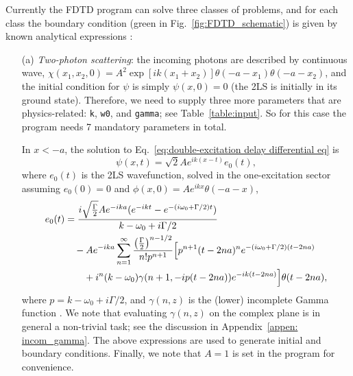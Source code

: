 \documentclass[12pt,letter,onecolumn,notitlepage]{article}
\begin{document}
Currently the FDTD program can solve three classes of problems, and for each class the boundary condition (green in Fig.~\ref{fig:FDTD_schematic}) is given by known analytical expressions \cite{FangNM17}:
\begin{enumerate}
	\item[(a)] \textit{Two-photon scattering}: the incoming photons are described by continuous wave, $\chi(x_1, x_2, 0) = A^2 \exp[i k (x_1+x_2)]\theta(-a-x_1)\theta(-a-x_2)$, and the initial condition for $\psi$ is simply $\psi(x,0)=0$ (the 2LS is initially in its ground state). Therefore, we need to supply three more parameters that are physics-related: \texttt{k}, \texttt{w0}, and \texttt{gamma}; see Table~\ref{table:input}. So for this case the program needs 7 mandatory parameters in total.
	
In $x<-a$, the solution to Eq.~\eqref{eq:double-excitation delay differential eq} is 
\begin{equation}
\psi(x,t) = \sqrt{2}Ae^{ik(x-t)}e_0(t), 
\label{eq: BC two-photon scattering}
\end{equation}
where $e_0(t)$ is the 2LS wavefunction, solved in the one-excitation sector assuming $e_0(0)=0$ and $\phi(x, 0)=A e^{ikx}\theta(-a-x)$,
\begin{align}
 e_0(t)&=\frac{i\sqrt{\frac{\Gamma}{2}} Ae^{-ika}(e^{-ikt}-e^{-(i\omega_0+\Gamma/2)t})}{k-\omega_0+i\Gamma/2}\nonumber\\
 &\quad- Ae^{-ika} \sum_{n=1}^{\infty}\frac{\left(\frac{\Gamma}{2}\right)^{n-1/2}}{n!p^{n+1}}
 \Bigl[p^{n+1}(t-2na)^n e^{-(i\omega_0+\Gamma/2)(t-2na)}\nonumber\\
 &\quad\quad+i^n(k-\omega_0)\gamma(n+1,-ip(t-2na))e^{-ik(t-2na)}
 \Bigr]\theta(t-2na),
 \label{eq:exact solution single-photon scattering}
\end{align}
where $p=k-\omega_0+i\Gamma/2$, and $\gamma(n, z)$ is the (lower) incomplete Gamma function \cite{NISThandbook}. We note that evaluating $\gamma(n, z)$ on the complex plane is in general a non-trivial task; see the discussion in Appendix~\ref{appen: incom_gamma}.
The above expressions are used to generate initial and boundary conditions. Finally, we note that $A=1$ is set in the program for convenience.


\end{enumerate}
\end{document}
